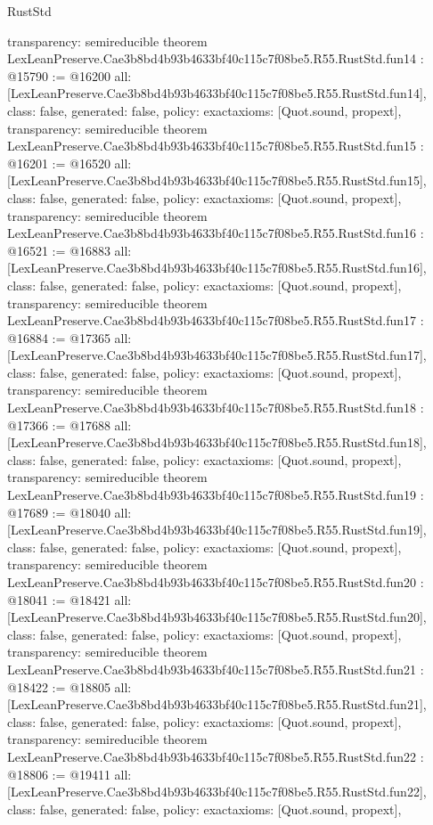 \begin{lexlean}{RustStd}
\begin{coremodule}
{  transparency: semireducible
}
theorem LexLeanPreserve.Cae3b8bd4b93b4633bf40c115c7f08be5.R55.RustStd.fun14 : @15790 := @16200 {
  all: [LexLeanPreserve.Cae3b8bd4b93b4633bf40c115c7f08be5.R55.RustStd.fun14],
  class: false,
  generated: false,
  policy: exact{axioms: [Quot.sound, propext]},
  transparency: semireducible
}
theorem LexLeanPreserve.Cae3b8bd4b93b4633bf40c115c7f08be5.R55.RustStd.fun15 : @16201 := @16520 {
  all: [LexLeanPreserve.Cae3b8bd4b93b4633bf40c115c7f08be5.R55.RustStd.fun15],
  class: false,
  generated: false,
  policy: exact{axioms: [Quot.sound, propext]},
  transparency: semireducible
}
theorem LexLeanPreserve.Cae3b8bd4b93b4633bf40c115c7f08be5.R55.RustStd.fun16 : @16521 := @16883 {
  all: [LexLeanPreserve.Cae3b8bd4b93b4633bf40c115c7f08be5.R55.RustStd.fun16],
  class: false,
  generated: false,
  policy: exact{axioms: [Quot.sound, propext]},
  transparency: semireducible
}
theorem LexLeanPreserve.Cae3b8bd4b93b4633bf40c115c7f08be5.R55.RustStd.fun17 : @16884 := @17365 {
  all: [LexLeanPreserve.Cae3b8bd4b93b4633bf40c115c7f08be5.R55.RustStd.fun17],
  class: false,
  generated: false,
  policy: exact{axioms: [Quot.sound, propext]},
  transparency: semireducible
}
theorem LexLeanPreserve.Cae3b8bd4b93b4633bf40c115c7f08be5.R55.RustStd.fun18 : @17366 := @17688 {
  all: [LexLeanPreserve.Cae3b8bd4b93b4633bf40c115c7f08be5.R55.RustStd.fun18],
  class: false,
  generated: false,
  policy: exact{axioms: [Quot.sound, propext]},
  transparency: semireducible
}
theorem LexLeanPreserve.Cae3b8bd4b93b4633bf40c115c7f08be5.R55.RustStd.fun19 : @17689 := @18040 {
  all: [LexLeanPreserve.Cae3b8bd4b93b4633bf40c115c7f08be5.R55.RustStd.fun19],
  class: false,
  generated: false,
  policy: exact{axioms: [Quot.sound, propext]},
  transparency: semireducible
}
theorem LexLeanPreserve.Cae3b8bd4b93b4633bf40c115c7f08be5.R55.RustStd.fun20 : @18041 := @18421 {
  all: [LexLeanPreserve.Cae3b8bd4b93b4633bf40c115c7f08be5.R55.RustStd.fun20],
  class: false,
  generated: false,
  policy: exact{axioms: [Quot.sound, propext]},
  transparency: semireducible
}
theorem LexLeanPreserve.Cae3b8bd4b93b4633bf40c115c7f08be5.R55.RustStd.fun21 : @18422 := @18805 {
  all: [LexLeanPreserve.Cae3b8bd4b93b4633bf40c115c7f08be5.R55.RustStd.fun21],
  class: false,
  generated: false,
  policy: exact{axioms: [Quot.sound, propext]},
  transparency: semireducible
}
theorem LexLeanPreserve.Cae3b8bd4b93b4633bf40c115c7f08be5.R55.RustStd.fun22 : @18806 := @19411 {
  all: [LexLeanPreserve.Cae3b8bd4b93b4633bf40c115c7f08be5.R55.RustStd.fun22],
  class: false,
  generated: false,
  policy: exact{axioms: [Quot.sound, propext]},
}
\end{coremodule}
\end{lexlean}
